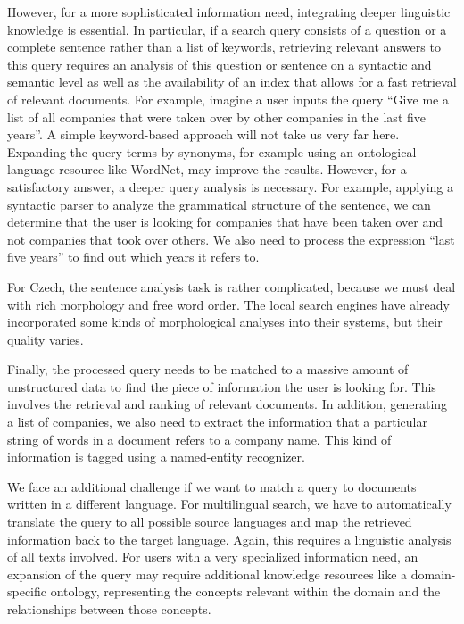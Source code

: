 \begin{multicols}{2}
However, for a more sophisticated information need, integrating deeper linguistic knowledge is essential. In particular, if a search query consists of a question or a complete sentence rather than a list of keywords, retrieving relevant answers to this query requires an analysis of this question or sentence on a syntactic and semantic level as well as the availability of an index that allows for a fast retrieval of relevant documents.
%
For example, imagine a user inputs the query “Give me a list of all companies that were taken over by other companies in the last five years”. A simple keyword-based approach will not take us very far here. Expanding the query terms by synonyms, for example using an ontological language resource like WordNet, may improve the results. However, for a satisfactory answer, a deeper query analysis is necessary. For example, applying a syntactic parser to analyze the grammatical structure of the sentence, we can determine that the user is looking for companies that have been taken over and not companies that took over others. We also need to process the expression “last five years” to find out which years it refers to.

For Czech, the sentence analysis task is rather complicated, because we must deal with rich morphology and free word order. The local search engines have already incorporated some kinds of morphological analyses into their systems, but their quality varies.

Finally, the processed query needs to be matched to a massive amount of unstructured data to find the piece of information the user is looking for. This involves the retrieval and ranking of relevant documents. In addition, generating a list of companies, we also need to extract the information that a particular string of words in a document refers to a company name. This kind of information is tagged using a named-entity recognizer.

We face an additional challenge if we want to match a query to documents written in a different language. For multilingual search, we have to automatically translate the query to all possible source languages and map the retrieved information back to the target language. Again, this requires a linguistic analysis of all texts involved. For users with a very specialized information need, an expansion of the query may require additional knowledge resources like a domain-specific ontology, representing the concepts relevant within the domain and the relationships between those concepts.


\end{multicols}
